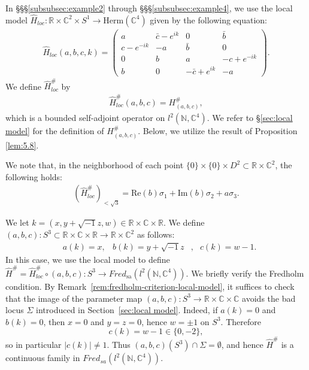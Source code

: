 \documentclass{amsart}
\theoremstyle{definition}
\theoremstyle{remark}
\newcommand{\C}{\mathbb{C}}
\newcommand{\R}{\mathbb{R}}
\begin{document}
In \S\S\S \ref{subsubsec:example2} through \S\S\S \ref{subsubsec:example4}, we use the local model $\hat{H}_{loc} \colon \mathbb{R} \times \mathbb{C}^2 \times S^1 \to \text{Herm}(\mathbb{C}^4)$ given by the following equation:
\begin{align*}
    \hat{H}_{loc}(a, b, c, k) = 
    \begin{pmatrix}
        a & \bar{c} - e^{ik} & 0 & \bar{b} \\
        c - e^{-ik} & -a & \bar{b} & 0 \\
        0 & b & a & -c + e^{-ik} \\
        b & 0 & -\bar{c} + e^{ik} & -a
    \end{pmatrix}.
\end{align*}
We define $\hat{H}^{\#}_{loc}$ by
\begin{align*}
    \hat{H}^{\#}_{loc}(a, b, c) = H^{\#}_{(a, b, c)},
\end{align*}
which is a bounded self-adjoint operator on $l^2(\mathbb{N}, \mathbb{C}^4)$.
We refer to \S \ref{sec:local model} for the definition of $H^{\#}_{(a, b, c)}$. Below, we utilize the result of Proposition \ref{lem:5.8}.

We note that, in the neighborhood of each point $\{0\} \times \{0\} \times D^2 \subset \mathbb{R} \times \mathbb{C}^2$, the following holds:
\begin{align*}
    (\hat{H}^{\#}_{loc})_{<\sqrt{3}} = \text{Re}(b) \sigma_1 + \text{Im}(b) \sigma_2 + a \sigma_3.
\end{align*}

We let $k = (x, y + \sqrt{-1} z, w) \in \mathbb{R} \times \mathbb{C} \times \mathbb{R}$.
We define $(a, b, c) \colon S^3 \subset \mathbb{R} \times \mathbb{C} \times \mathbb{R} \to \mathbb{R} \times \mathbb{C}^2$ as follows:
\begin{align*}
    &a(k) = x, &b(k) = y + \sqrt{-1} z&, &c(k) = w - 1.
\end{align*}
In this case, we use the local model to define $\hat{H}^{\#} = \hat{H}^{\#}_{loc} \circ (a, b, c) \colon S^3 \to Fred_{\text{sa}}(l^2(\mathbb{N}, \mathbb{C}^4))$.
We briefly verify the Fredholm condition.
By Remark~\ref{rem:fredholm-criterion-local-model}, it suffices to check that the image of
the parameter map $(a,b,c)\colon S^3\to \R\times \C\times \C$ avoids the bad locus
$\Sigma$ introduced in Section~\ref{sec:local model}.
Indeed, if $a(k)=0$ and $b(k)=0$, then $x=0$ and $y=z=0$, hence $w=\pm 1$ on $S^3$.
Therefore
\[
c(k)=w-1\in\{0,-2\},
\]
so in particular $|c(k)|\neq 1$.
Thus $(a,b,c)(S^3)\cap \Sigma=\emptyset$, and hence $\hat H^\#$ is a continuous family in
$Fred_{sa}(l^2(\mathbb N,\mathbb C^4))$.
\end{document}
